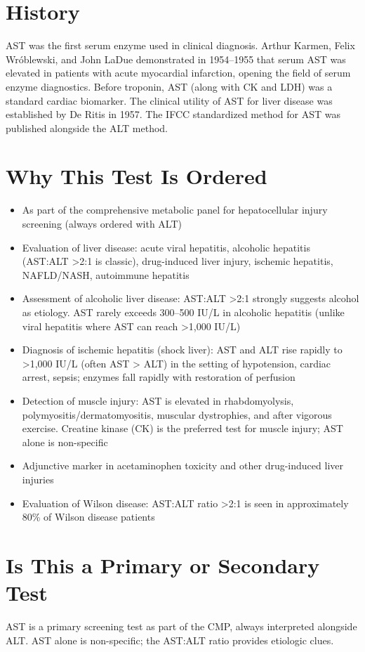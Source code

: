 \section*{History}
AST was the first serum enzyme used in clinical diagnosis. Arthur Karmen, Felix Wr\'{o}blewski, and John LaDue demonstrated in 1954--1955 that serum AST was elevated in patients with acute myocardial infarction, opening the field of serum enzyme diagnostics. Before troponin, AST (along with CK and LDH) was a standard cardiac biomarker. The clinical utility of AST for liver disease was established by De Ritis in 1957. The IFCC standardized method for AST was published alongside the ALT method.

\section*{Why This Test Is Ordered}
\begin{itemize}
  \item As part of the comprehensive metabolic panel for hepatocellular injury screening (always ordered with ALT)
  \item Evaluation of liver disease: acute viral hepatitis, alcoholic hepatitis (AST:ALT >2:1 is classic), drug-induced liver injury, ischemic hepatitis, NAFLD/NASH, autoimmune hepatitis
  \item Assessment of alcoholic liver disease: AST:ALT >2:1 strongly suggests alcohol as etiology. AST rarely exceeds 300--500 IU/L in alcoholic hepatitis (unlike viral hepatitis where AST can reach >1,000 IU/L)
  \item Diagnosis of ischemic hepatitis (shock liver): AST and ALT rise rapidly to >1,000 IU/L (often AST > ALT) in the setting of hypotension, cardiac arrest, sepsis; enzymes fall rapidly with restoration of perfusion
  \item Detection of muscle injury: AST is elevated in rhabdomyolysis, polymyositis/dermatomyositis, muscular dystrophies, and after vigorous exercise. Creatine kinase (CK) is the preferred test for muscle injury; AST alone is non-specific
  \item Adjunctive marker in acetaminophen toxicity and other drug-induced liver injuries
  \item Evaluation of Wilson disease: AST:ALT ratio >2:1 is seen in approximately 80\% of Wilson disease patients
\end{itemize}

\section*{Is This a Primary or Secondary Test}
AST is a primary screening test as part of the CMP, always interpreted alongside ALT. AST alone is non-specific; the AST:ALT ratio provides etiologic clues.

